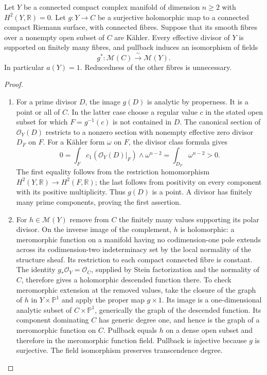 \begin{proposition}\hypertarget{tag-01GG}{}\label{cdp:st:E1}

Let $Y$ be a connected compact complex manifold of dimension $n\geq2$
with $H^2(Y,\mathbb R)=0$. Let $g:Y\to C$ be a surjective holomorphic
map to a connected compact Riemann surface, with connected fibres.
Suppose that its smooth fibres over a nonempty open subset of $C$ are
K\"ahler. Every effective divisor of $Y$ is supported on finitely many
fibres, and pullback induces an isomorphism of fields
\[
 g^*: \mathcal M(C)\xrightarrow{\ \sim\ }\mathcal M(Y).
\]
In particular $a(Y)=1$. Reducedness of the other fibres is unnecessary.
\end{proposition}


\begin{proof}

\begin{enumerate}[label={$\langle1\rangle$\arabic*.},leftmargin=*]
\item For a prime divisor $D$, the image $g(D)$ is analytic by properness. It
is a point or all of $C$. In the latter case choose a regular value $c$
in the stated open subset for which $F=g^{-1}(c)$ is not contained in
$D$. The canonical section of $\mathcal O_Y(D)$ restricts to a nonzero
section with nonempty effective zero divisor $D_F$ on $F$. For a
K\"ahler form $\omega$ on $F$, the divisor class formula gives
\[
 0=\int_F c_1(\mathcal O_Y(D)|_F)\wedge\omega^{n-2}
   =\int_{D_F}\omega^{n-2}>0.
\]
The first equality follows from the restriction homomorphism
$H^2(Y,\mathbb R)\to H^2(F,\mathbb R)$; the last follows from positivity
on every component with its positive multiplicity. Thus $g(D)$ is a
point. A divisor has finitely many prime components, proving the first
assertion.

\item For $h\in\mathcal M(Y)$ remove from $C$ the finitely many values
supporting its polar divisor. On the inverse image of the complement,
$h$ is holomorphic: a meromorphic function on a manifold having no
codimension-one pole extends across its codimension-two indeterminacy
set by the local normality of the structure sheaf. Its restriction to
each compact connected fibre is constant. The identity
$g_*\mathcal O_Y=\mathcal O_C$, supplied by Stein factorization and
the normality of $C$, therefore gives a holomorphic descended function
there. To check meromorphic extension at the removed values, take the
closure of the graph of $h$ in $Y\times\mathbb P^1$ and apply the proper
map $g\times1$. Its image is a one-dimensional analytic subset of
$C\times\mathbb P^1$, generically the graph of the descended function.
Its component dominating $C$ has generic degree one, and hence is the
graph of a meromorphic function on $C$. Pullback equals $h$ on a dense
open subset and therefore in the meromorphic function field. Pullback
is injective because $g$ is surjective. The field isomorphism preserves transcendence degree.

\end{enumerate}
\end{proof}